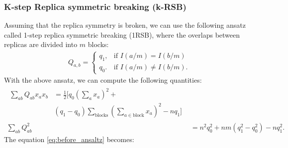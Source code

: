 \subsubsection{K-step Replica symmetric breaking (k-RSB)}
Assuming that the replica symmetry is broken, we can use the following ansatz called 1-step replica symmetric breaking (1RSB), where the overlaps between replicas are divided into $m$ blocks:
\begin{eqnarray}
    Q_{a,b}=\begin{cases}
			q_1, & \text{if } I(a/m)=I(b/m) \\
            q_0. & \text{if } I(a/m) \neq I(b/m).
		 \end{cases}
\end{eqnarray}
With the above ansatz, we can compute the following quantities:
\begin{align}
\begin{split}
    \sum_{ab} Q_{ab} x_{a} x_{b}  &  = \frac{1}{2} \bigg[ q_0 \left( \sum_{a}x_a\right)^2 +\\ 
& (q_1-q_0) \sum_{\text{blocks}}  \left( \sum_{a \in \text{block}}x_a\right)^2   - nq_1\bigg] 
\end{split}
\\
\sum_{ab} Q_{ab}^2 & =  n^2 q_0^2 + nm(q_1^2 - q_0^2) -n q_1^2.
\end{align}
The equation \ref{eq:before_ansaltz} becomes:
